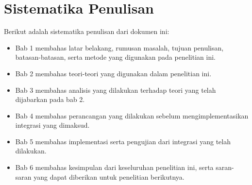 \section{Sistematika Penulisan}
\label{sec:sistematika_penulisan}
Berikut adalah sistematika penulisan dari dokumen ini:
\begin{itemize}
	\item Bab 1 membahas latar belakang, rumusan masalah, tujuan penulisan,
		batasan-batasan, serta metode yang digunakan pada penelitian ini.
	\item Bab 2 membahas teori-teori yang digunakan dalam penelitian ini.
	\item Bab 3 membahas analisis yang dilakukan terhadap teori yang telah
		dijabarkan pada bab 2.
	\item Bab 4 membahas perancangan yang dilakukan sebelum
		mengimplementasikan integrasi yang dimaksud.
	\item Bab 5 membahas implementasi serta pengujian dari integrasi yang
		telah dilakukan.
	\item Bab 6 membahas kesimpulan dari keseluruhan penelitian ini, serta
		saran-saran yang dapat diberikan untuk penelitian berikutnya.
\end{itemize}